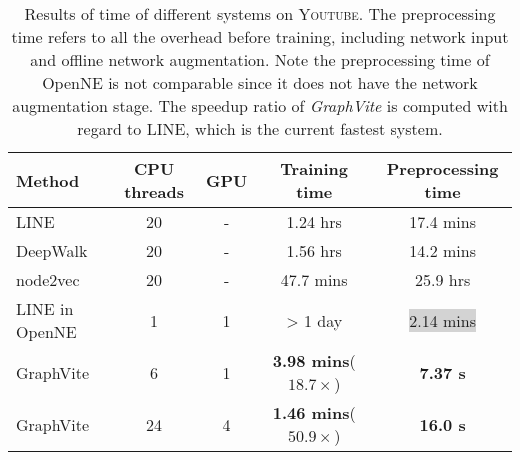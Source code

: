 \documentclass[sigconf]{acmart}
\newcommand{\dataset}[1]{\textsc{#1}\xspace}
\newcommand{\best}[1]{\textbf{#1}}
\newcommand{\Graphy}{\textit{GraphVite}\xspace}
\begin{document}
\begin{table*}
    \centering
    \begin{tabular}{lcccc}
         \toprule
         Method                                 & CPU threads   & GPU       & Training time                     & Preprocessing time                \\
         \midrule
         LINE \cite{tang2015line}               & 20            & -         & 1.24 hrs                          & 17.4 mins                         \\
         DeepWalk \cite{perozzi2014deepwalk}    & 20            & -         & 1.56 hrs                          & 14.2 mins                         \\
         node2vec \cite{grover2016node2vec}     & 20            & -         & 47.7 mins                         & 25.9 hrs                          \\
         \midrule
         LINE in OpenNE \cite{thunlp2017openne} & 1             & 1         & > 1 day                           & \colorbox{lightgray}{2.14 mins}   \\
         \midrule
         GraphVite                              & 6             & 1         & \best{3.98 mins}($18.7\times$)    & \best{7.37 s}                     \\
         GraphVite                              & 24            & 4         & \best{1.46 mins}($50.9\times$)    & \best{16.0 s}                     \\
         \bottomrule
    \end{tabular}
    \caption{Results of time of different systems on \dataset{Youtube}. The preprocessing time refers to all the overhead before training, including network input and offline network augmentation. Note the preprocessing time of OpenNE is not comparable since it does not have the network augmentation stage. The speedup ratio of \Graphy is computed with regard to LINE, which is the current fastest system.}
    \label{tab:time_youtube}
\end{table*}
\end{document}
